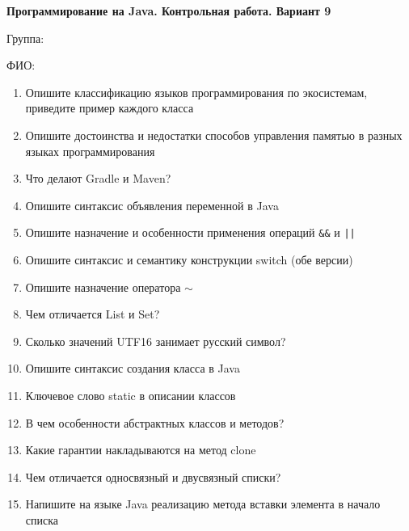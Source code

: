 \documentclass[12pt]{article}
\begin{document}
\newpage\begin{minipage}{\textwidth}
\textbf{Программирование на Java. Контрольная работа. Вариант 9}

Группа: \underline{\hspace{3cm}}

ФИО: \underline{\hspace{10cm}}

\begin{enumerate}
\item Опишите классификацию языков программирования по экосистемам, приведите пример каждого класса
\item Опишите достоинства и недостатки способов управления памятью в разных языках программирования
\item Что делают Gradle и Maven?
\item Опишите синтаксис объявления переменной в Java
\item Опишите назначение и особенности применения операций \verb|&&| и \verb!||!
\item Опишите синтаксис и семантику конструкции switch (обе версии)
\item Опишите назначение оператора $\sim$
\item Чем отличается List и Set?
\item Сколько значений UTF16 занимает русский символ?
\item Опишите синтаксис создания класса в Java
\item Ключевое слово static в описании классов
\item В чем особенности абстрактных классов и методов?
\item Какие гарантии накладываются на метод clone
\item Чем отличается односвязный и двусвязный списки?
\item Напишите на языке Java реализацию метода вставки элемента в начало списка

\end{enumerate}
\end{minipage}
\end{document}

